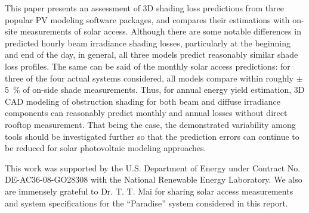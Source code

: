 \documentclass[twocolumn,10pt]{asme2ej}
\begin{document}
This paper presents an assessment of 3D shading loss predictions from three popular PV modeling software packages, and compares their estimations with on-site measurements of solar access.  Although there are some notable differences in predicted hourly beam irradiance shading losses, particularly at the beginning and end of the day, in general, all three models predict reasonably similar shade loss profiles.  The same can be said of the monthly solar access predictions: for three of the four actual systems considered, all models compare within roughly $\pm$5~\% of on-side shade measurements.  Thus, for annual energy yield estimation, 3D CAD modeling of obstruction shading for both beam and diffuse irradiance components can reasonably predict monthly and annual losses without direct rooftop measurement.  That being the case, the demonstrated variability among tools should be investigated further so that the prediction errors can continue to be reduced for solar photovoltaic modeling approaches.


\begin{acknowledgment}
This work was supported by the U.S. Department of Energy under Contract No. DE-AC36-08-GO28308 with the National Renewable Energy Laboratory.  We also are immensely grateful to Dr. T. T. Mai for sharing solar access measurements and system specifications for the ``Paradise'' system considered in this report.
\end{acknowledgment}

%
\end{document}
